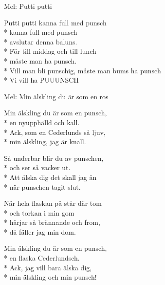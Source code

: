 \begin{SongText}
    \begin{SongInfo}
        Mel: Putti putti
    \end{SongInfo}
    \begin{SongVerse}
        Putti putti kanna full med punsch\\*%
        kanna full med punsch\\*%
        avslutar denna baluns.\\*%
        För till middag och till lunch\\*%
        måste man ha punsch.\\*%
        Vill man bli punschig, måste man bums ha punsch\\*%
        Vi vill ha PUUUNSCH
    \end{SongVerse}\end{SongText}
\begin{SongText}
    \begin{SongInfo}
        Mel: Min älskling du är som en ros
    \end{SongInfo}
    \begin{SongVerse}
        Min älskling du är som en punsch,\\*%
        en nyupphälld och kall.\\*%
        Ack, som en Cederlunds så ljuv,\\*%
        min älskling, jag är knall.
    \end{SongVerse}
    \begin{SongVerse}
        Så underbar blir du av punschen,\\*%
        och ser så vacker ut.\\*%
        Att älska dig det skall jag än\\*%
        när punschen tagit slut.
    \end{SongVerse}
    \begin{SongVerse}
        När hela flaskan på står där tom\\*%
        och torkan i min gom\\*%
        härjar så brännande och from,\\*%
        då fäller jag min dom.
    \end{SongVerse}
    \begin{SongVerse}
        Min älskling du är som en punsch,\\*%
        en flaska Cederlundsch.\\*%
        Ack, jag vill bara älska dig,\\*%
        min älskling och min punsch!
    \end{SongVerse}\end{SongText}
